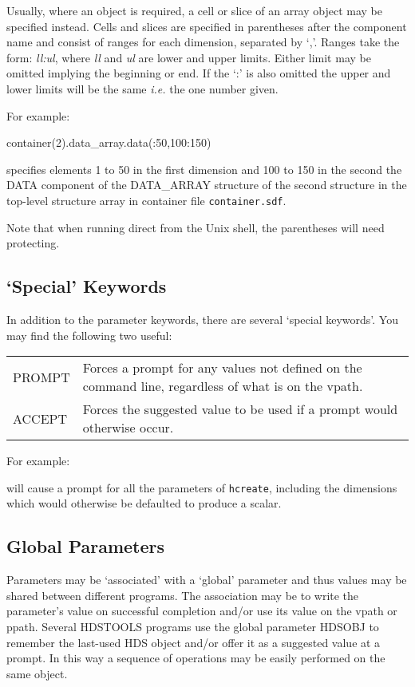 \documentclass[twoside,11pt,nolof]{starlink}
\begin{document}
Usually, where an object is required, a cell or slice of an array object may be
specified instead. Cells and slices are specified in parentheses after the
component name and consist of ranges for each dimension, separated by `,'.
Ranges take the form: \textit{ll:ul}, where \textit{ll} and \textit{ul} are
lower and upper limits. Either limit may be omitted implying the beginning or
end. If the `:' is also omitted the upper and lower limits will be the same
\textit{i.e.} the one number given.

For example:
\begin{terminalv}
container(2).data_array.data(:50,100:150)
\end{terminalv}
specifies elements 1 to 50 in the first dimension and 100 to 150 in the second
the DATA component of the DATA\_ARRAY structure of the second structure in the
top-level structure array in container file \texttt{container.sdf}.

Note that when running direct from the Unix shell, the parentheses will need
protecting.

\subsection{`Special' Keywords}
In addition to the parameter keywords, there are several `special keywords'.
You may find the following two useful:

\begin{tabular}[t]{p{0.8in}p{5in}}
PROMPT & Forces a prompt for any values not defined on the command
line, regardless of what is on the vpath. \\
ACCEPT & Forces the suggested value to be used if a prompt would
otherwise occur.
\end{tabular}

For example:
\begin{terminalv}
\end{terminalv}
will cause a prompt for all the parameters of \texttt{hcreate}, including
the dimensions which would otherwise be defaulted to produce a scalar.

\subsection{Global Parameters}
Parameters may be `associated' with a `global' parameter and thus values
may be shared between different programs. The association may be to write the
parameter's value on successful completion and/or use its value on the vpath
or ppath. Several HDSTOOLS programs use the global parameter HDSOBJ to
remember the last-used HDS object and/or offer it as a suggested value at a
prompt. In this way a sequence of operations may be easily performed on the
same object.
\end{document}
